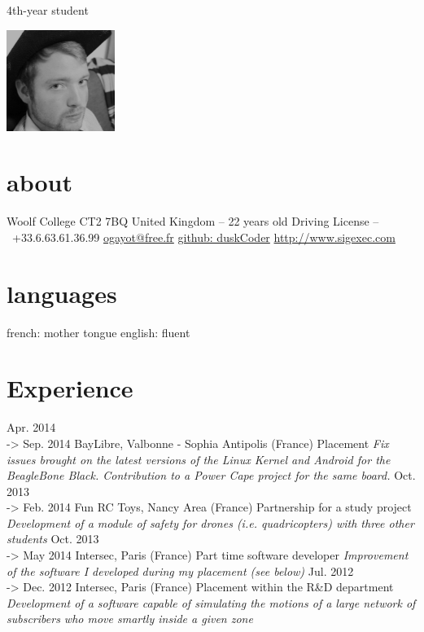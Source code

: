 \documentclass[]{friggeri-cv}
\begin{document}
       {4th-year student}


\begin{aside}
    \includegraphics[width=100pt]{photo.png}
  \section{about}
    Woolf College
    CT2 7BQ
    United Kingdom
    --
    22 years old
    Driving License
    --
    ~
    \phone \ +33.6.63.61.36.99
    \href{mailto:ogayot@free.fr}{ogayot@free.fr}
    \href{https://github.com/duskCoder}{github: duskCoder}
    \href{http://www.sigexec.com}{http://www.sigexec.com}
  \section{languages}
    french: mother tongue
    english: fluent
\end{aside}

\section{Experience}

\begin{entrylist}
  \entry
    {Apr. 2014 \\-> Sep. 2014}
    {BayLibre, Valbonne - Sophia Antipolis (France)}
    {Placement}
    {\emph{Fix issues brought on the latest versions of the Linux Kernel and Android for the BeagleBone Black. Contribution to a Power Cape project for the same board.}}
  \entry
    {Oct. 2013 \\-> Feb. 2014}
    {Fun RC Toys, Nancy Area (France)}
    {Partnership for a study project}
    {\emph{Development of a module of safety for drones (i.e. quadricopters) with three other students}}
  \entry
    {Oct. 2013 \\-> May 2014}
    {Intersec, Paris (France)}
    {Part time software developer}
    {\emph{Improvement of the software I developed during my placement (see below)}}
  \entry
    {Jul. 2012 \\-> Dec. 2012}
    {Intersec, Paris (France)}
    {Placement within the R\&D department}
    {\emph{Development of a software capable of simulating the motions of a large network of subscribers who move smartly inside a given zone}}
\end{entrylist}
\end{document}
